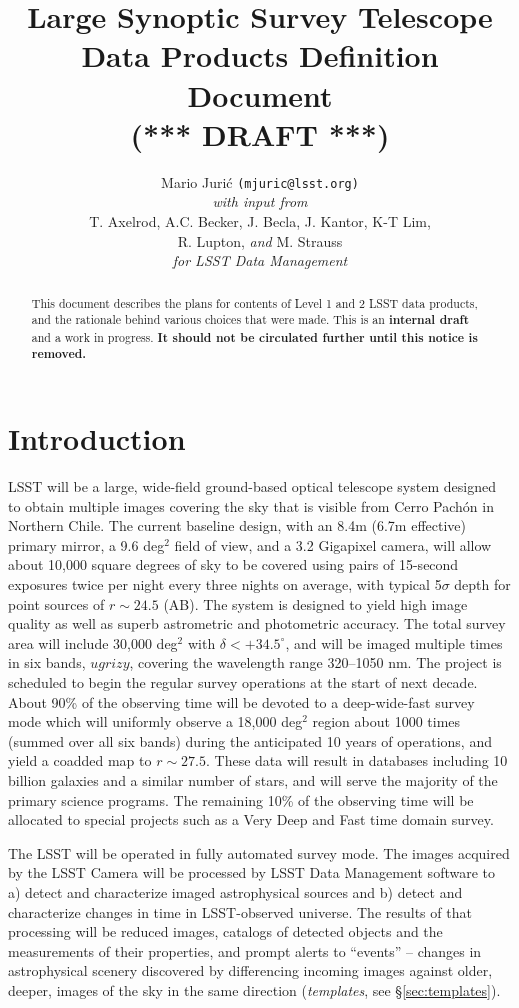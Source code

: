 \documentclass[12pt]{article}
\title{Large Synoptic Survey Telescope \\
Data Products Definition Document \\
(*** DRAFT ***)}
\author{
    Mario Juri\'c \texttt{(mjuric@lsst.org)} \vspace{1ex} \\
    {\em with input from} \vspace{1ex} \\
    T. Axelrod, A.C. Becker, J. Becla,  J. Kantor, K-T Lim,\\
    R. Lupton, {\em and} M. Strauss \vspace{1.2ex} \\
    {\em for LSST Data Management}
}
\newcommand{\B}[1]{{#1}}
\newcommand{\R}[1]{{\color{red}}}
\begin{document}
\maketitle

\begin{abstract}
This document describes the plans for contents of Level 1 and 2 LSST data products, and the rationale behind various choices that were made. This is an {\bf internal draft} and a work in progress. {\bf It should not be circulated further until this notice is removed.}
\end{abstract}

\tableofcontents

\section{Introduction}

LSST will be a large, wide-field ground-based optical telescope system
designed to obtain multiple images covering the sky that is visible from Cerro Pach\'{o}n in Northern Chile. The current baseline design, with an 8.4m (6.7m effective) primary mirror, a 9.6 deg$^2$ field of view, and a 3.2 Gigapixel camera, will allow about 10,000 square degrees of sky to be covered using pairs  of 15-second exposures \R{in two photometric bands} \B{twice per night} every three nights on average, with typical 5$\sigma$ depth for point sources of $r\sim24.5$ (AB). The system is designed to yield high image quality as well as superb astrometric  and photometric accuracy. The \B{total} survey area will include 30,000 deg$^2$ with $\delta<+34.5^\circ$, and will be imaged multiple times in six bands, $ugrizy$, covering the wavelength range 320--1050 nm. The project is scheduled to  begin the regular survey operations at the start of next decade. About 90\% of the observing time will be devoted to a deep-wide-fast survey mode which will \B{uniformly} observe a 18,000 deg$^2$ region about 1000 times (summed over all six bands) during the anticipated 10 years of operations, and yield a coadded map to $r\sim27.5$. These data will result in databases including 10 billion galaxies and a similar number of stars, and will serve the majority of the primary science programs. The remaining 10\% of the observing time will be allocated to special projects such as a Very Deep and Fast time domain survey.

The LSST will be operated in fully automated survey mode. The images acquired by the LSST Camera will be processed by LSST Data Management software to a) detect and characterize imaged astrophysical sources and b) detect and characterize changes in time in LSST-observed universe. The results of that processing will be reduced images, catalogs of detected objects and the measurements of their properties, and prompt alerts to ``events'' -- changes in astrophysical scenery discovered by differencing incoming images against older, deeper, images of the sky in the same direction ({\em templates}, see \S \ref{sec:templates}).
\end{document}
